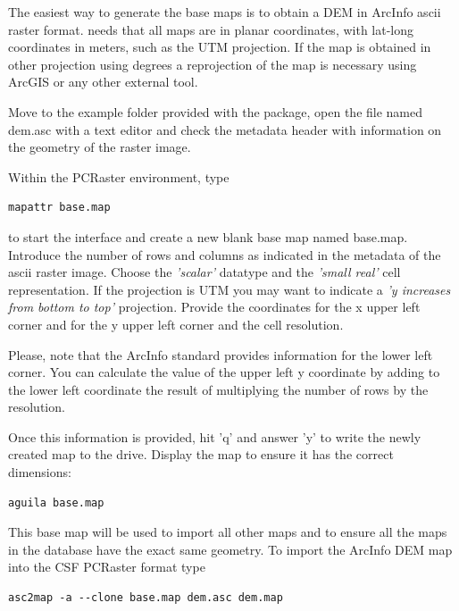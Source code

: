 The easiest way to generate the base maps is to obtain a DEM in ArcInfo ascii raster format. \echo needs that all maps are in planar coordinates, with lat-long coordinates in meters, such as the UTM projection. If the map is obtained in other projection using degrees a reprojection of the map is necessary using ArcGIS or any other external tool. 

Move to the example folder provided with the \echo package, open the file named \textsf{dem.asc} with a text editor and check the metadata header with information on the geometry of the raster image.

Within the PCRaster environment, type 

\begin{verbatim}
mapattr base.map
\end{verbatim}

to start the interface and create a new blank base map named \textsf{base.map}. Introduce the number of rows and columns as indicated in the metadata of the ascii raster image. Choose the \textit{'scalar'} datatype and the \textit{'small real'} cell representation. If the projection is UTM you may want to indicate a \textit{'y increases from bottom to top'} projection. Provide the coordinates for the x upper left corner and for the y upper left corner and the cell resolution.
 
 \medskip 
\begin{Frame}
Please, note that the ArcInfo standard provides information for the lower left corner. You can calculate the value of the upper left y coordinate by adding to the lower left coordinate the result of multiplying the number of rows by the resolution.
\end{Frame}
 \medskip
 
Once this information is provided, hit 'q' and answer 'y' to write the newly created map to the drive. Display the map to ensure it has the correct dimensions:

\begin{verbatim}
aguila base.map
\end{verbatim}
 
This base map will be used to import all other maps and to ensure all the maps in the database have the exact same geometry. To import the ArcInfo DEM map into the CSF PCRaster format type

\begin{verbatim}
asc2map -a --clone base.map dem.asc dem.map
\end{verbatim}

